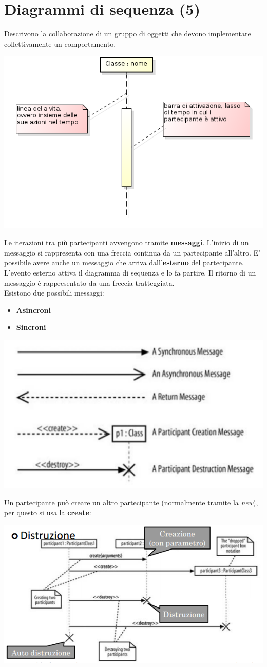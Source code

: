 



\section{Diagrammi di sequenza (5)}

Descrivono la collaborazione di un gruppo di oggetti che devono implementare collettivamente un comportamento.

\includegraphics[width=0.5\columnwidth]{img6} %


Le iterazioni tra più partecipanti avvengono tramite \textbf{messaggi}. L'inizio di un messaggio si rappresenta con una freccia continua da un partecipante all'altro. E' possibile avere anche un messaggio che arriva dall'\textbf{esterno} del partecipante. L'evento esterno attiva il diagramma di sequenza e lo fa partire. Il ritorno di un messaggio è rappresentato da una freccia tratteggiata.\\
Esistono due possibili messaggi: 
\begin{itemize}
	\item \textbf{Asincroni}
	\item \textbf{Sincroni}
\end{itemize}

\includegraphics[width=0.5\columnwidth]{img5} %


Un partecipante può creare un altro partecipante (normalmente tramite la \textit{new}), per questo si usa la \textbf{create}:

\includegraphics[width=0.5\columnwidth]{img7} %


